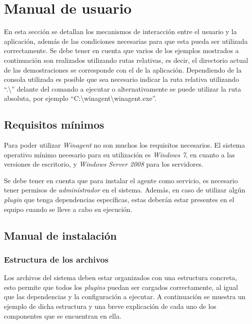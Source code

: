 \section{Manual de usuario} \label{sec:man}
    En esta sección se detallan los mecanismos de interacción entre el usuario y la aplicación, además de las condiciones necesarias para que esta pueda ser utilizada correctamente. Se debe tener en cuenta que varios de los ejemplos mostrados a continuación son realizados utilizando rutas relativas, es decir, el directorio actual de las demostraciones se corresponde con el de la aplicación. Dependiendo de la consola utilizada es posible que sea necesario indicar la ruta relativa utilizando ``.\textbackslash'' delante del comando a ejecutar o alternativamente se puede utilizar la ruta absoluta, por ejemplo ``C:\textbackslash{}winagent\textbackslash{}winagent.exe''. 

    \subsection{Requisitos mínimos}
        Para poder utilizar \textit{Winagent} no son muchos los requisitos necesarios. El sistema operativo mínimo necesario para su utilización es \textit{Windows 7}, en cuanto a las versiones de escritorio, y \textit{Windows Server 2008} para los servidores.
        
        Se debe tener en cuenta que para instalar el agente como servicio, es necesario tener permisos de \textit{administrador} en el sistema. Además, en caso de utilizar algún \textit{plugin} que tenga dependencias específicas, estas deberán estar presentes en el equipo cuando se lleve a cabo su ejecución.
        
    \subsection{Manual de instalación}
        \subsubsection{Estructura de los archivos}
            Los archivos del sistema deben estar organizados con una estructura concreta, esto permite que todos los \textit{plugins} puedan ser cargados correctamente, al igual que las dependencias y la configuración a ejecutar. A continuación se muestra un ejemplo de dicha estructura y una breve explicación de cada uno de los componentes que se encuentran en ella.
            
